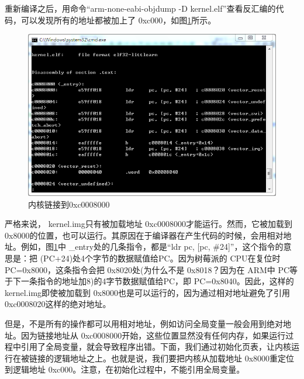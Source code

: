 \documentclass[main.tex]{subfiles}
\begin{document}
\begin{CJK*}{UTF8}{song}
\begin{code}
\label{code:4-2}
\inputminted[firstline=79,lastline=120,linenos,numbersep=5pt,frame=lines,framesep=2mm]{gas}{src/chapter04/kernel/entry.S}
\end{code}

重新编译之后，用命令“arm-\-none-\-eabi-\-objdump -D kernel.elf”查看反汇编的代码，可以发现所有的地址都被加上了 0xc000，如图\ref{figure:4-5}所示。

\begin{figure}[htp]
\centering
\includegraphics[scale=0.5]{figures/4-5}
\caption{内核链接到0xc0008000}
\label{figure:4-5}
\end{figure}

严格来说， kernel.img只有被加载地址 0xc000\-8000才能运行。然而，它被加载到 0x8000的位置，也可以运行。其原因在于编译器在产生代码的时候，会用相对地址。例如，图\ref{figure:4-5}中 \_entry处的几条指令，都是“ldr pc, [pc, \#24]”，这个指令的意思是：把 (PC+24)处4个字节的数据赋值给PC。因为树莓派的 CPU在复位时 PC=0x8000，这条指令会把 0x8020处(为什么不是 0x8018？因为在 ARM中 PC等于下一条指令的地址加8)的4字节数据赋值给PC，即 PC=0x8040。因此，这样的 kernel.img即使被加载到 0x8000也是可以运行的，因为通过相对地址避免了引用 0xc000\-8020这样的绝对地址。

\par
但是，不是所有的操作都可以用相对地址，例如访问全局变量一般会用到绝对地址。因为链接地址从 0xc000\-8000开始，这些位置显然没有任何内存，如果运行过程中引用了全局变量，就会导致程序出错。下面，我们通过初始化页表，让内核运行在被链接的逻辑地址之上。也就是说，我们要把内核从加载地址 0x8000重定位到逻辑地址 0xc000。注意，在初始化过程中，不能引用全局变量。


\end{CJK*}
\end{document}
